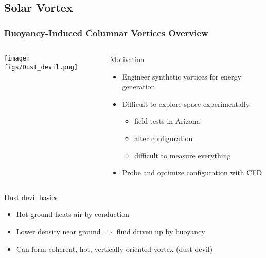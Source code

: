 \documentclass[mathserif]{beamer}
\begin{document}
\subsection{Solar Vortex}
\begin{frame}
\frametitle{Buoyancy-Induced Columnar Vortices Overview}
%
\begin{columns}[]
  \begin{column}{0.45\linewidth}
   \begin{center}
    \texttt{[image: figs/Dust\_devil.png]}
   \end{center}
  \end{column}
  \begin{column}{0.55\linewidth}
   \begin{block}{Motivation}
    \begin{itemize}
     \item Engineer synthetic vortices for energy generation
     \item Difficult to explore space experimentally
	   \begin{itemize}
	    \item field tests in Arizona
	    \item alter configuration
	    \item difficult to measure everything
	   \end{itemize}
     \item Probe and optimize configuration with CFD
    \end{itemize}
   \end{block}

  \end{column}
\end{columns}

\begin{block}{Dust devil basics}
  \begin{itemize}
  \item Hot ground heats air by conduction
  \item Lower density near ground $\Rightarrow$ fluid driven up by buoyancy
  \item Can form coherent, hot, vertically oriented vortex (dust devil)
  \end{itemize}
\end{block}

\end{frame}
\end{document}
